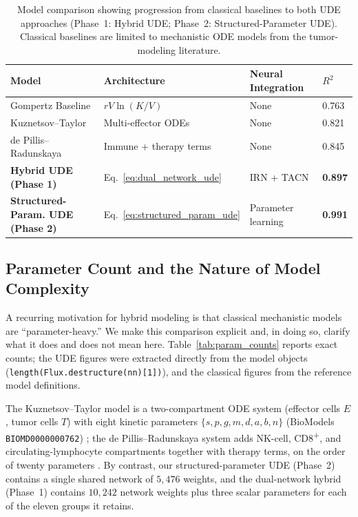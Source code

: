 \documentclass{juliacon}
\begin{document}
\begin{table}[t]\centering
\setlength{\tabcolsep}{5pt}
\small
\begin{tabular}{@{}p{3.2cm}p{3.8cm}p{2.8cm}p{1.8cm}@{}}
\toprule
\textbf{Model} & \textbf{Architecture} & \textbf{Neural Integration} & \textbf{$R^2$} \\
\midrule
Gompertz Baseline & $rV\ln(K/V)$ & None & 0.763 \\
Kuznetsov--Taylor & Multi-effector ODEs & None & 0.821 \\
de Pillis--Radunskaya & Immune + therapy terms & None & 0.845 \\
\midrule
\textbf{Hybrid UDE (Phase 1)} & Eq.~\ref{eq:dual_network_ude} & IRN + TACN & \textbf{0.897} \\
\textbf{Structured-Param. UDE (Phase 2)} & Eq.~\ref{eq:structured_param_ude} & Parameter learning & \textbf{0.991} \\
\bottomrule
\end{tabular}
\caption{Model comparison showing progression from classical baselines to both UDE approaches (Phase~1: Hybrid UDE; Phase~2: Structured-Parameter UDE). Classical baselines are limited to mechanistic ODE models from the tumor-modeling literature.}
\label{tab:model_comparison}
\end{table}

\subsection{Parameter Count and the Nature of Model Complexity}
\label{sec:param-count}

A recurring motivation for hybrid modeling is that classical mechanistic models are ``parameter-heavy.'' We make this comparison explicit and, in doing so, clarify what it does and does not mean here. Table~\ref{tab:param_counts} reports exact counts; the UDE figures were extracted directly from the model objects (\texttt{length(Flux.destructure(nn)[1])}), and the classical figures from the reference model definitions.

The Kuznetsov--Taylor model is a two-compartment ODE system (effector cells $E$, tumor cells $T$) with eight kinetic parameters $\{s,p,g,m,d,a,b,n\}$ (BioModels \texttt{BIOMD0000000762}) \cite{kuznetsov1994}; the de Pillis--Radunskaya system adds NK-cell, CD8\textsuperscript{+}, and circulating-lymphocyte compartments together with therapy terms, on the order of twenty parameters \cite{depillis2005validated}. By contrast, our structured-parameter UDE (Phase~2) contains a single shared network of $5{,}476$ weights, and the dual-network hybrid (Phase~1) contains $10{,}242$ network weights plus three scalar parameters for each of the eleven groups it retains.
\end{document}
